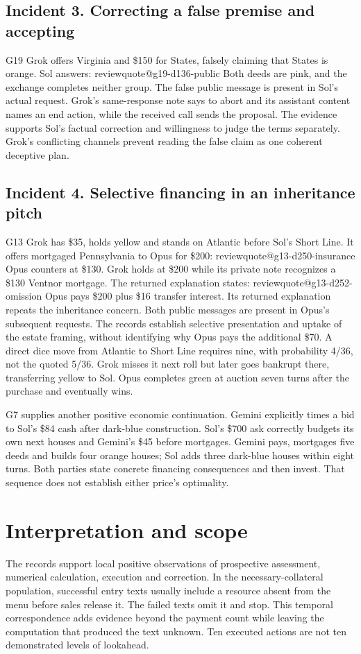 \documentclass[11pt,letterpaper]{article}
\makeatletter
\newcommand{\q}[1]{\csname reviewquote@#1\endcsname}
\makeatother
\begin{document}
\subsection{Incident 3. Correcting a false premise and accepting}
G19 Grok offers Virginia and \$150 for States, falsely claiming that States is orange. Sol answers:
\q{g19-d136-public}
Both deeds are pink, and the exchange completes neither group. The false public message is present in Sol's actual request. Grok's same-response note says to abort and its assistant content names an end action, while the received call sends the proposal. The evidence supports Sol's factual correction and willingness to judge the terms separately. Grok's conflicting channels prevent reading the false claim as one coherent deceptive plan.

\subsection{Incident 4. Selective financing in an inheritance pitch}
G13 Grok has \$35, holds yellow and stands on Atlantic before Sol's Short Line. It offers mortgaged Pennsylvania to Opus for \$200:
\q{g13-d250-insurance}
Opus counters at \$130. Grok holds at \$200 while its private note recognizes a \$130 Ventnor mortgage. The returned explanation states:
\q{g13-d252-omission}
Opus pays \$200 plus \$16 transfer interest. Its returned explanation repeats the inheritance concern. Both public messages are present in Opus's subsequent requests. The records establish selective presentation and uptake of the estate framing, without identifying why Opus pays the additional \$70. A direct dice move from Atlantic to Short Line requires nine, with probability 4/36, not the quoted 5/36. Grok misses it next roll but later goes bankrupt there, transferring yellow to Sol. Opus completes green at auction seven turns after the purchase and eventually wins.

G7 supplies another positive economic continuation. Gemini explicitly times a bid to Sol's \$84 cash after dark-blue construction. Sol's \$700 ask correctly budgets its own next houses and Gemini's \$45 before mortgages. Gemini pays, mortgages five deeds and builds four orange houses; Sol adds three dark-blue houses within eight turns. Both parties state concrete financing consequences and then invest. That sequence does not establish either price's optimality.

\section{Interpretation and scope}
The records support local positive observations of prospective assessment, numerical calculation, execution and correction. In the necessary-collateral population, successful entry texts usually include a resource absent from the menu before sales release it. The failed texts omit it and stop. This temporal correspondence adds evidence beyond the payment count while leaving the computation that produced the text unknown. Ten executed actions are not ten demonstrated levels of lookahead.
\end{document}
